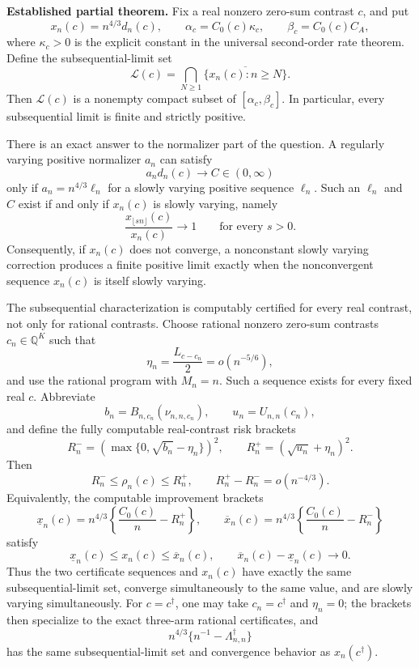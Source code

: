 \textbf{Established partial theorem.}
Fix a real nonzero zero-sum contrast \(c\), and put
\[
 x_n(c)=n^{4/3}d_n(c),\qquad
 \alpha_c=C_0(c)\kappa_c,\qquad
 \beta_c=C_0(c)C_A,
\]
where \(\kappa_c>0\) is the explicit constant in the universal second-order rate theorem.  Define the subsequential-limit set
\[
 \mathcal L(c)=\bigcap_{N\geq1}
 \overline{\{x_n(c):n\geq N\}}.
\]
Then \(\mathcal L(c)\) is a nonempty compact subset of
\([\alpha_c,\beta_c]\).  In particular, every subsequential limit is finite and strictly positive.

There is an exact answer to the normalizer part of the question.  A regularly varying positive normalizer \(a_n\) can satisfy
\[
 a_nd_n(c)\longrightarrow C\in(0,\infty)
\]
only if \(a_n=n^{4/3}\ell_n\) for a slowly varying positive sequence \(\ell_n\).  Such an \(\ell_n\) and \(C\) exist if and only if \(x_n(c)\) is slowly varying, namely
\[
 \frac{x_{\lfloor sn\rfloor}(c)}{x_n(c)}\longrightarrow1
 \qquad\text{for every }s>0.
\]
Consequently, if \(x_n(c)\) does not converge, a nonconstant slowly varying correction produces a finite positive limit exactly when the nonconvergent sequence \(x_n(c)\) is itself slowly varying.

The subsequential characterization is computably certified for every real contrast, not only for rational contrasts.  Choose rational nonzero zero-sum contrasts \(c_n\in\mathbb Q^K\) such that
\[
 \eta_n=\frac{L_{c-c_n}}2=o(n^{-5/6}),
\]
and use the rational program with \(M_n=n\).  Such a sequence exists for every fixed real \(c\).  Abbreviate
\[
 b_n=B_{n,c_n}(\nu_{n,n,c_n}),
 \qquad
 u_n=U_{n,n}(c_n),
\]
and define the fully computable real-contrast risk brackets
\[
 R_n^-=\left(\max\{0,\sqrt{b_n}-\eta_n\}\right)^2,
 \qquad
 R_n^+=\left(\sqrt{u_n}+\eta_n\right)^2.
\]
Then
\[
 R_n^-\leq\rho_n(c)\leq R_n^+,
 \qquad
 R_n^+-R_n^-=o(n^{-4/3}).
\]
Equivalently, the computable improvement brackets
\[
 \underline x_n(c)=n^{4/3}\left\{\frac{C_0(c)}n-R_n^+\right\},
 \qquad
 \overline x_n(c)=n^{4/3}\left\{\frac{C_0(c)}n-R_n^-\right\}
\]
satisfy
\[
 \underline x_n(c)\leq x_n(c)\leq\overline x_n(c),
 \qquad
 \overline x_n(c)-\underline x_n(c)\longrightarrow0.
\]
Thus the two certificate sequences and \(x_n(c)\) have exactly the same subsequential-limit set, converge simultaneously to the same value, and are slowly varying simultaneously.  For \(c=c^\dagger\), one may take \(c_n=c^\dagger\) and \(\eta_n=0\); the brackets then specialize to the exact three-arm rational certificates, and
\[
 n^{4/3}\{n^{-1}-\Lambda_{n,n}^\dagger\}
\]
has the same subsequential-limit set and convergence behavior as \(x_n(c^\dagger)\).

